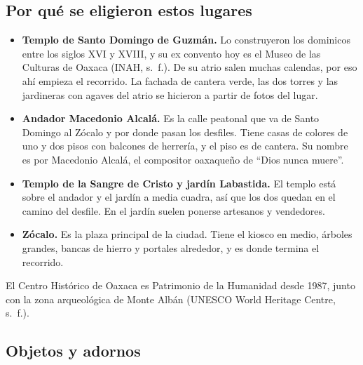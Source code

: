 \documentclass[11pt,a4paper]{article}
\begin{document}
\subsection{Por qué se eligieron estos lugares}

\begin{itemize}
  \item \textbf{Templo de Santo Domingo de Guzmán.} Lo construyeron los dominicos entre los siglos XVI y XVIII, y su ex convento hoy es el Museo de las Culturas de Oaxaca (INAH, s.~f.). De su atrio salen muchas calendas, por eso ahí empieza el recorrido. La fachada de cantera verde, las dos torres y las jardineras con agaves del atrio se hicieron a partir de fotos del lugar.
  \item \textbf{Andador Macedonio Alcalá.} Es la calle peatonal que va de Santo Domingo al Zócalo y por donde pasan los desfiles. Tiene casas de colores de uno y dos pisos con balcones de herrería, y el piso es de cantera. Su nombre es por Macedonio Alcalá, el compositor oaxaqueño de ``Dios nunca muere''.
  \item \textbf{Templo de la Sangre de Cristo y jardín Labastida.} El templo está sobre el andador y el jardín a media cuadra, así que los dos quedan en el camino del desfile. En el jardín suelen ponerse artesanos y vendedores.
  \item \textbf{Zócalo.} Es la plaza principal de la ciudad. Tiene el kiosco en medio, árboles grandes, bancas de hierro y portales alrededor, y es donde termina el recorrido.
\end{itemize}

El Centro Histórico de Oaxaca es Patrimonio de la Humanidad desde 1987, junto con la zona arqueológica de Monte Albán (UNESCO World Heritage Centre, s.~f.).

\subsection{Objetos y adornos}
\end{document}
